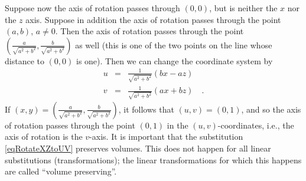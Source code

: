 \documentclass[12pt]{book}
\begin{document}
Suppose now the axis of rotation passes through $(0,0)$, but is neither the $x$ nor the $z$ axis. Suppose in addition the axis of rotation passes through the point $(a,b)$, $a\neq 0$. Then the axis of rotation passes through the point $(\frac{a}{\sqrt{a^2+b^2}},\frac{b}{\sqrt{a^2+b^2}})$ as well (this is one of the two points on the line whose distance to $(0,0)$ is one). Then we can change the coordinate system by
\begin{equation}\label{eqRotateXZtoUV}
\begin{array}{rcl}
u &=&\frac{1}{\sqrt{a^2+b^2}}\left( bx-az\right)\\
v &=& \frac{1}{\sqrt{a^2+b^2}}\left( ax+bz\right)\quad .
\end{array}
\end{equation}
If $(x,y)= (\frac{a}{\sqrt{a^2+b^2}}, \frac{b}{ \sqrt{a^2 +b^2}})$, it follows that $(u,v)=(0,1)$, and so the axis of rotation passes through the point $(0,1)$ in the $(u,v)$-coordinates, i.e., the axis of rotation is the $v$-axis. It is important that the substitution \eqref{eqRotateXZtoUV} preserves volumes. This does not happen for all linear substitutions (transformations); the linear transformations for which this happens are called ``volume preserving''.
\end{document}
